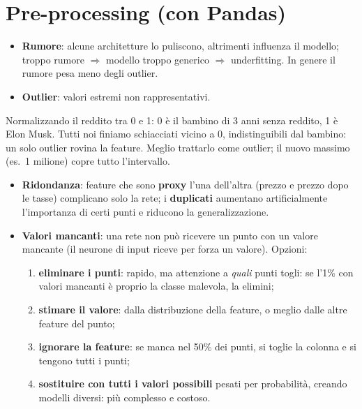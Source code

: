 \section{Pre-processing (con Pandas)}
\begin{itemize}
  \item \textbf{Rumore}: alcune architetture lo puliscono, altrimenti influenza il modello; troppo rumore $\Rightarrow$ modello troppo
        generico $\Rightarrow$ underfitting. In genere il rumore pesa meno degli outlier.
  \item \textbf{Outlier}: valori estremi non rappresentativi.
\end{itemize}
\begin{esempio}
Normalizzando il reddito tra 0 e 1: 0 è il bambino di 3 anni senza reddito, 1 è Elon Musk. Tutti noi finiamo
schiacciati vicino a 0, indistinguibili dal bambino: un solo outlier rovina la feature. Meglio trattarlo come outlier;
il nuovo massimo (es.\ 1 milione) copre tutto l'intervallo.
\end{esempio}
\begin{itemize}
  \item \textbf{Ridondanza}: feature che sono \textbf{proxy} l'una dell'altra (prezzo e prezzo dopo le tasse) complicano solo la rete;
        i \textbf{duplicati} aumentano artificialmente l'importanza di certi punti e riducono la generalizzazione.
  \item \textbf{Valori mancanti}: una rete non può ricevere un punto con un valore mancante (il neurone di input riceve per forza un valore). Opzioni:
  \begin{enumerate}
    \item \textbf{eliminare i punti}: rapido, ma attenzione a \emph{quali} punti togli: se l'1\% con valori mancanti è proprio
          la classe malevola, la elimini;
    \item \textbf{stimare il valore}: dalla distribuzione della feature, o meglio dalle altre feature del punto;
    \item \textbf{ignorare la feature}: se manca nel 50\% dei punti, si toglie la colonna e si tengono tutti i punti;
    \item \textbf{sostituire con tutti i valori possibili} pesati per probabilità, creando modelli diversi: più complesso e costoso.
  \end{enumerate}
\end{itemize}

